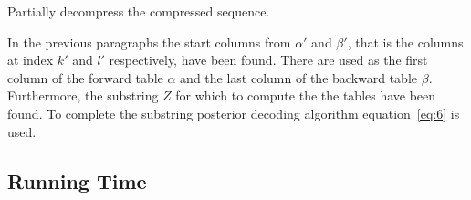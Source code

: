 \begin{algorithm}
  \caption{Partially decompress the compressed sequence.}
  \label{alg:decompress}
  \begin{algorithmic}[1]
                 
                    \EndIf{}
                \Else{}
                \EndIf{}
                 
            \EndIf{}
        \EndWhile{}
    \EndProcedure{}
\end{algorithmic}
\end{algorithm}

In the previous paragraphs the start columns from $\alpha'$ and $\beta'$, that
is the columns at index $k'$ and $l'$ respectively, have been found. There are
used as the first column of the forward table $\alpha$ and the last column of
the backward table $\beta$. Furthermore, the substring $Z$ for which to compute
the the tables have been found. To complete the substring posterior decoding
algorithm equation~\eqref{eq:6} is used.

\subsection{Running Time}
\label{sec:running-time-2}

